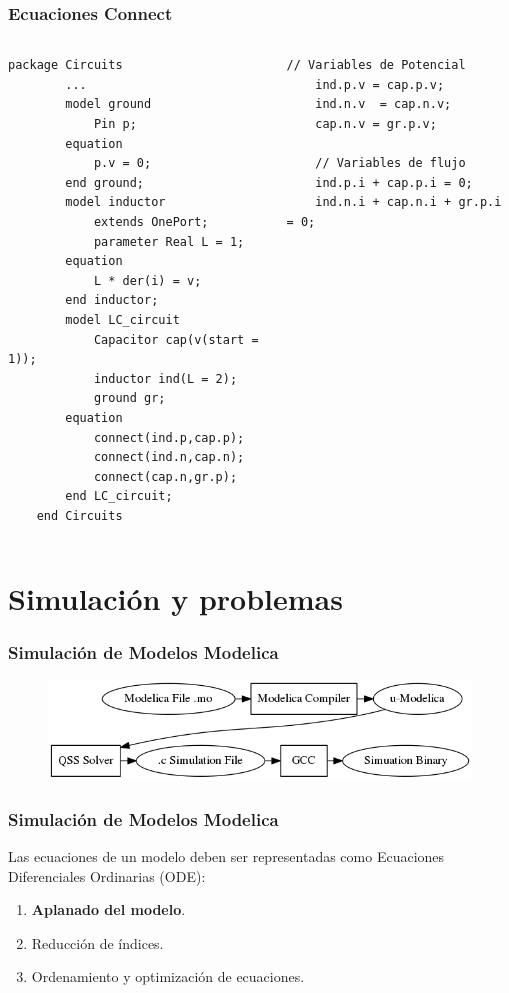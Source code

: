 \documentclass[aspectratio=169,10pt]{beamer}
\begin{document}
\begin{frame}[fragile]
\frametitle{Ecuaciones Connect} 
\begin{columns}  
\column[T]{8cm}
 \begin{lstlisting}[basicstyle=\ttfamily\scriptsize,style=base]
    package Circuits
        ...
        model ground
            Pin p;
        equation
            p.v = 0;
        end ground;
        model inductor
            extends OnePort;
            parameter Real L = 1;
        equation
            L * der(i) = v;
        end inductor;
        model LC_circuit
            Capacitor cap(v(start = 1));
            inductor ind(L = 2);
            ground gr;
        equation
            connect(ind.p,cap.p);
            connect(ind.n,cap.n);
            connect(cap.n,gr.p);
        end LC_circuit;
    end Circuits
\end{lstlisting}
\column[T]{6cm}
 \begin{lstlisting}[style=base]
    // Variables de Potencial
    ind.p.v = cap.p.v;
    ind.n.v  = cap.n.v;
    cap.n.v = gr.p.v;
    
    // Variables de flujo
    ind.p.i + cap.p.i = 0;
    ind.n.i + cap.n.i + gr.p.i = 0;
\end{lstlisting}
\end{columns}
\end{frame}

\section{Simulaci\'on y problemas}

\begin{frame}[fragile]
\frametitle{Simulaci\'on de Modelos Modelica} 
    \begin{figure}
      \centering
      \includegraphics[scale=0.5]{Compilacion} 
      \label{fig:proceso}
    \end{figure}
\end{frame}


\begin{frame}[fragile]
\frametitle{Simulaci\'on de Modelos Modelica} 
 Las ecuaciones de un modelo deben ser representadas como Ecuaciones Diferenciales Ordinarias (ODE): 
 \begin{enumerate}
 \item \textbf{Aplanado del modelo}.
 \item Reducci\'on de \'indices.
 \item Ordenamiento y optimizaci\'on de ecuaciones.
 \end{enumerate}
 
\end{frame}
\end{document}
